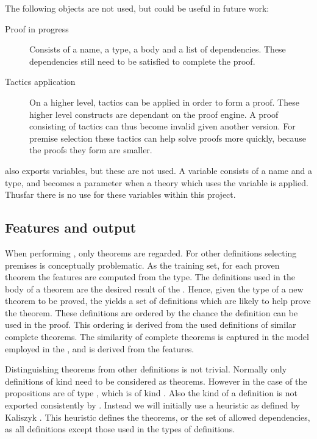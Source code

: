 The following objects are not used, but could be useful in future work:
\begin{description}
    \item[Proof in progress]
        Consists of a name, a type, a body and a list of dependencies.
        These dependencies still need to be satisfied to complete the proof.
    \item[Tactics application]
        On a higher level, tactics can be applied in order to form a proof.
        These higher level constructs are dependant on the proof engine.
        A proof consisting of tactics can thus become invalid given another \coq version.
        For premise selection these tactics can help solve proofs more quickly, because the proofs they form are smaller.
\end{description}

\coq also exports variables, but these are not used.
A variable consists of a name and a type, and becomes a parameter when a theory which uses the variable is applied.
Thusfar there is no use for these variables within this project.

\subsection{Features and output}
\label{section:features}
When performing \premiseselection, only theorems are regarded.
For other definitions selecting premises is conceptually problematic.
As the training set, for each proven theorem the features are computed from the type.
The definitions used in the body of a theorem are the desired result of the \premiseselection.
Hence, given the type of a new theorem to be proved, the \premiseselection yields a set of definitions which are likely to help prove the theorem.
These definitions are ordered by the chance the definition can be used in the proof.
This ordering is derived from the used definitions of similar complete theorems.
The similarity of complete theorems is captured in the model employed in the \premiseselection, and is derived from the features.

Distinguishing theorems from other definitions is not trivial.
Normally only definitions of kind \prop need to be considered as theorems.
However in the case of \corn the propositions are of type \cprop, which is of kind \kindtype.
Also the kind of a definition is not exported consistently by \coq \citationeeded.
Instead we will initially use a heuristic as defined by Kaliszyk \cite{kaliszyk2014machine}.
This heuristic defines the theorems, or the set of allowed dependencies, as all definitions except those used in the types of definitions.

